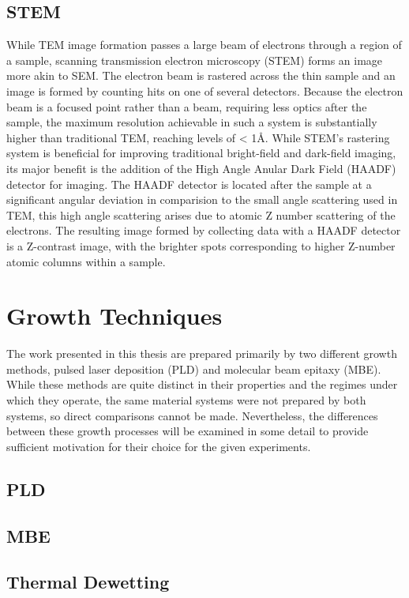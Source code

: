 \subsection{STEM}
While TEM image formation passes a large beam of electrons through a region of a sample, scanning transmission electron microscopy (STEM) forms an image more akin to SEM. The electron beam is rastered across the thin sample and an image is formed by counting hits on one of several detectors. Because the electron beam is a focused point rather than a beam, requiring less optics after the sample, the maximum resolution achievable in such a system is substantially higher than traditional TEM, reaching levels of < 1\AA{}. While STEM's rastering system is beneficial for improving traditional bright-field and dark-field imaging, its major benefit is the addition of the High Angle Anular Dark Field (HAADF) detector for imaging. The HAADF detector is located after the sample at a significant angular deviation in comparision to the small angle scattering used in TEM, this high angle scattering arises due to atomic Z number scattering of the electrons. The resulting image formed by collecting data with a HAADF detector is a Z-contrast image, with the brighter spots corresponding to higher Z-number atomic columns within a sample.


\section{Growth Techniques}
The work presented in this thesis are prepared primarily by two different growth methods, pulsed laser deposition (PLD) and molecular beam epitaxy (MBE). While these methods are quite distinct in their properties and the regimes under which they operate, the same material systems were not prepared by both systems, so direct comparisons cannot be made. Nevertheless, the differences between these growth processes will be examined in some detail to provide sufficient motivation for their choice for the given experiments.
\subsection{PLD}
\subsection{MBE}
\subsection{Thermal Dewetting}